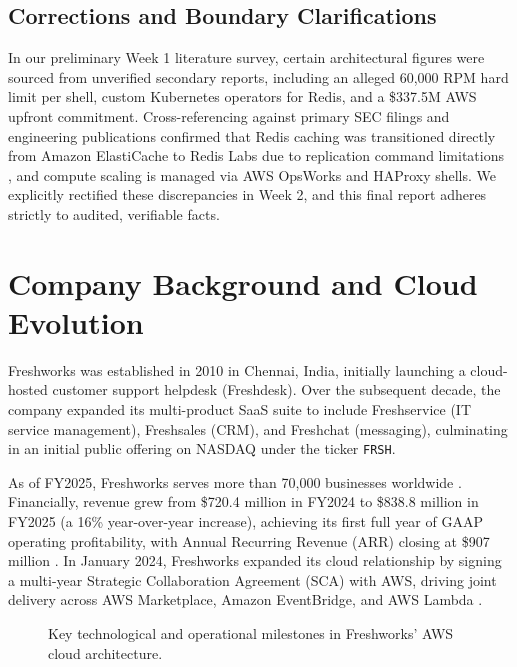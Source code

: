 \documentclass[10pt,a4paper]{article}
\begin{document}
\subsection{Corrections and Boundary Clarifications}
In our preliminary Week 1 literature survey, certain architectural figures were sourced from unverified secondary reports, including an alleged 60,000 RPM hard limit per shell, custom Kubernetes operators for Redis, and a \$337.5M AWS upfront commitment. Cross-referencing against primary SEC filings and engineering publications confirmed that Redis caching was transitioned directly from Amazon ElastiCache to Redis Labs due to replication command limitations \cite{fw_redis_migration}, and compute scaling is managed via AWS OpsWorks and HAProxy shells. We explicitly rectified these discrepancies in Week 2, and this final report adheres strictly to audited, verifiable facts.

\section{Company Background and Cloud Evolution}
Freshworks was established in 2010 in Chennai, India, initially launching a cloud-hosted customer support helpdesk (Freshdesk). Over the subsequent decade, the company expanded its multi-product SaaS suite to include Freshservice (IT service management), Freshsales (CRM), and Freshchat (messaging), culminating in an initial public offering on NASDAQ under the ticker \texttt{FRSH}.

As of FY2025, Freshworks serves more than 70,000 businesses worldwide \cite{aws_passport}. Financially, revenue grew from \$720.4 million in FY2024 to \$838.8 million in FY2025 (a 16\% year-over-year increase), achieving its first full year of GAAP operating profitability, with Annual Recurring Revenue (ARR) closing at \$907 million \cite{fw_q4_2025, fw_fool_2025}. In January 2024, Freshworks expanded its cloud relationship by signing a multi-year Strategic Collaboration Agreement (SCA) with AWS, driving joint delivery across AWS Marketplace, Amazon EventBridge, and AWS Lambda \cite{fw_sca_2024}.

\begin{figure}[H]
\centering
{}
\caption{Key technological and operational milestones in Freshworks' AWS cloud architecture.}
\label{fig:timeline}
\end{figure}
\end{document}
